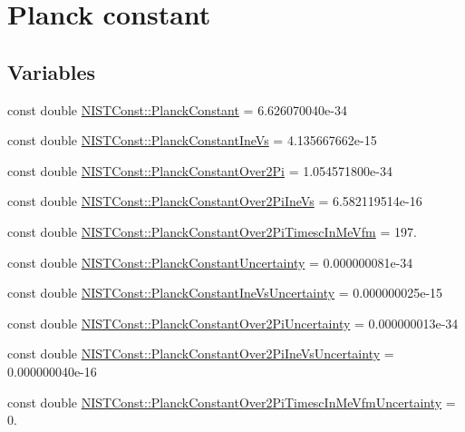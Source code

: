 \hypertarget{group___planck_constant}{}\section{Planck constant}
\label{group___planck_constant}
\subsection*{Variables}
\begin{DoxyCompactItemize}
\item 
const double \hyperlink{group___planck_constant_ga6caa482b17de2f08f423eff1a521b0d7}{N\+I\+S\+T\+Const\+::\+Planck\+Constant} = 6.\+626070040e-\/34
\item 
const double \hyperlink{group___planck_constant_ga4587d736f45c35788453a9509eaee7f2}{N\+I\+S\+T\+Const\+::\+Planck\+Constant\+Ine\+Vs} = 4.\+135667662e-\/15
\item 
const double \hyperlink{group___planck_constant_ga9b3484c3c80e4a97206c7945b0db539b}{N\+I\+S\+T\+Const\+::\+Planck\+Constant\+Over2\+Pi} = 1.\+054571800e-\/34
\item 
const double \hyperlink{group___planck_constant_ga1d45cff7c25d4ebb0639311d5c3ea20d}{N\+I\+S\+T\+Const\+::\+Planck\+Constant\+Over2\+Pi\+Ine\+Vs} = 6.\+582119514e-\/16
\item 
const double \hyperlink{group___planck_constant_ga76ea84456bc32be18fa15034da108214}{N\+I\+S\+T\+Const\+::\+Planck\+Constant\+Over2\+Pi\+Timesc\+In\+Me\+Vfm} = 197.
\item 
const double \hyperlink{group___planck_constant_gaf490152b8477c6ead134e42e76753f64}{N\+I\+S\+T\+Const\+::\+Planck\+Constant\+Uncertainty} = 0.\+000000081e-\/34
\item 
const double \hyperlink{group___planck_constant_ga566abddd238d05d995f61aa5d8663b3c}{N\+I\+S\+T\+Const\+::\+Planck\+Constant\+Ine\+Vs\+Uncertainty} = 0.\+000000025e-\/15
\item 
const double \hyperlink{group___planck_constant_ga9a87455000578edf387376117fd5bfd8}{N\+I\+S\+T\+Const\+::\+Planck\+Constant\+Over2\+Pi\+Uncertainty} = 0.\+000000013e-\/34
\item 
const double \hyperlink{group___planck_constant_ga4b2be019a874ac4dab4031b849242335}{N\+I\+S\+T\+Const\+::\+Planck\+Constant\+Over2\+Pi\+Ine\+Vs\+Uncertainty} = 0.\+000000040e-\/16
\item 
const double \hyperlink{group___planck_constant_gae5db39f3f8b53c75ed26b3b83b74bb42}{N\+I\+S\+T\+Const\+::\+Planck\+Constant\+Over2\+Pi\+Timesc\+In\+Me\+Vfm\+Uncertainty} = 0.

\end{DoxyCompactItemize}
